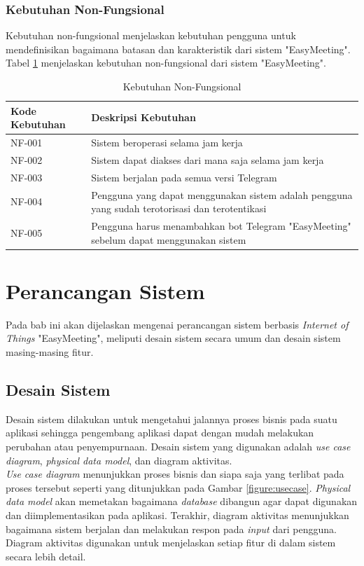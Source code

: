 \subsubsection{Kebutuhan Non-Fungsional}
\tab Kebutuhan non-fungsional menjelaskan kebutuhan pengguna untuk mendefinisikan bagaimana batasan dan karakteristik dari sistem "EasyMeeting". Tabel \ref{table:kebutuhan_non_fungsional} menjelaskan kebutuhan non-fungsional dari sistem "EasyMeeting".

\begin{table}[H]
	\centering
	\begin{tabular}{ | p{3cm} | p{6cm} | }
		\hline
		\textbf{Kode Kebutuhan} & \textbf{Deskripsi Kebutuhan} \\ \hline
		NF-001 & Sistem beroperasi selama jam kerja \\ \hline
		NF-002 & Sistem dapat diakses dari mana saja selama jam kerja \\ \hline
		NF-003 & Sistem berjalan pada semua versi Telegram \\ \hline
		NF-004 & Pengguna yang dapat menggunakan sistem adalah pengguna yang sudah terotorisasi dan terotentikasi \\ \hline
		NF-005 & Pengguna harus menambahkan bot Telegram "EasyMeeting" sebelum dapat menggunakan sistem \\ \hline
	\end{tabular} \caption{Kebutuhan Non-Fungsional}
	\label{table:kebutuhan_non_fungsional}
\end{table}

\section{Perancangan Sistem}
\tab Pada bab ini akan dijelaskan mengenai perancangan sistem berbasis \textit{Internet of Things} "EasyMeeting", meliputi desain sistem secara umum dan desain sistem masing-masing fitur.

\subsection{Desain Sistem}
\tab Desain sistem dilakukan untuk mengetahui jalannya proses bisnis pada suatu aplikasi sehingga pengembang aplikasi dapat dengan mudah melakukan perubahan atau penyempurnaan. Desain sistem yang digunakan adalah \textit{use case diagram}, \textit{physical data model}, dan diagram aktivitas.\\
\tab \textit{Use case diagram} menunjukkan proses bisnis dan siapa saja yang terlibat pada proses tersebut seperti yang ditunjukkan pada Gambar \ref{figure:usecase}. \textit{Physical data model} akan memetakan bagaimana \textit{database} dibangun agar dapat digunakan dan diimplementasikan pada aplikasi. Terakhir, diagram aktivitas menunjukkan bagaimana sistem berjalan dan melakukan respon pada \textit{input} dari pengguna. Diagram aktivitas digunakan untuk menjelaskan setiap fitur di dalam sistem secara lebih detail.

